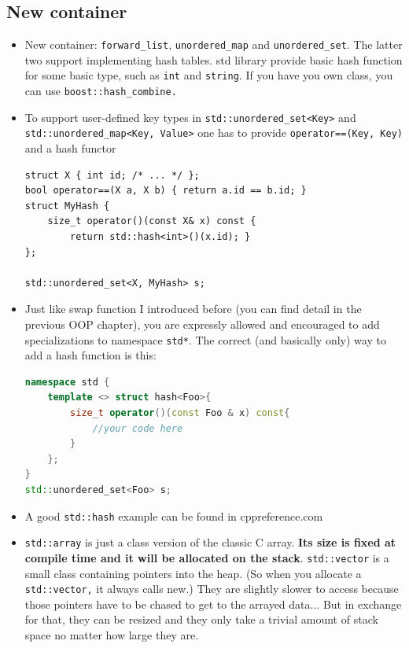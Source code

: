 \documentclass[a4paper,11pt,twoside]{book}
\begin{document}
\subsection{New container}
\begin{itemize}

    \item New container: \texttt{forward\_list}, \texttt{unordered\_map} and \texttt{unordered\_set}.  The latter two support implementing hash tables. std library provide basic hash function for some basic type, such as \texttt{int} and \texttt{string}. If you have you own class, you can use \texttt{boost::hash\_combine.} 

    \item To support user-defined key types in \texttt{std::unordered\_set<Key>} and \texttt{std::unordered\_map<Key, Value>} one has to provide \texttt{operator==(Key, Key)} and a hash functor
\begin{lstlisting}[numbers=none]
struct X { int id; /* ... */ };
bool operator==(X a, X b) { return a.id == b.id; }
struct MyHash {
	size_t operator()(const X& x) const { 
		return std::hash<int>()(x.id); }
};

std::unordered_set<X, MyHash> s;
\end{lstlisting}

    \item Just like swap function I introduced before (you can find detail in the previous OOP chapter), you are expressly allowed and encouraged to add specializations to namespace \texttt{std*}. The correct (and basically only) way to add a hash function is this:
\begin{lstlisting}[frame=single, language=c++]
namespace std {
	template <> struct hash<Foo>{
		size_t operator()(const Foo & x) const{
			//your code here
		}
	};
}
std::unordered_set<Foo> s;
\end{lstlisting}

    \item A good \texttt{std::hash} example can be found in cppreference.com 

    \item \texttt{std::array} is just a class version of the classic C array. \textbf{Its size is fixed at compile time and it will be allocated  on the stack}. \texttt{std::vector} is a small class containing pointers into the heap. (So when you allocate a \texttt{std::vector,} it always calls new.) They are slightly slower to access because those pointers have to be chased to get to the arrayed data... But in exchange for that, they can be resized and they only take a trivial amount of stack space no matter how large they are.


\end{itemize}
\end{document}
